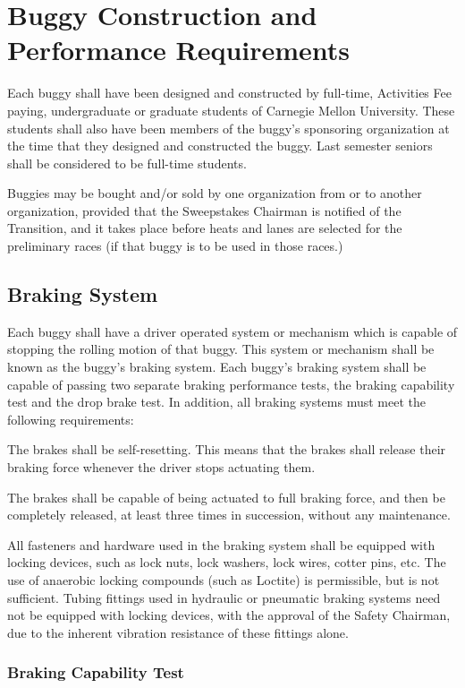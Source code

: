 \chapter{Buggy Construction and Performance Requirements}

Each buggy shall have been designed and constructed by full-time, Activities Fee paying, undergraduate or graduate students of Carnegie Mellon University. These students shall also have been members of the buggy's sponsoring organization at the time that they designed and constructed the buggy. Last semester seniors shall be considered to be full-time students.

Buggies may be bought and/or sold by one organization from or to another organization, provided that the Sweepstakes Chairman is notified of the Transition, and it takes place before heats and lanes are selected for the preliminary races (if that buggy is to be used in those races.)

\section{Braking System}

Each buggy shall have a driver operated system or mechanism which is capable of stopping the rolling motion of that buggy. This system or mechanism shall be known as the buggy's braking system. Each buggy's braking system shall be capable of passing two separate braking performance tests, the braking capability test and the drop brake test. In addition, all braking systems must meet the following requirements:

The brakes shall be self-resetting. This means that the brakes shall release their braking force whenever the driver stops actuating them.

The brakes shall be capable of being actuated to full braking force, and then be completely released, at least three times in succession, without any maintenance.

All fasteners and hardware used in the braking system shall be equipped with locking devices, such as lock nuts, lock washers, lock wires, cotter pins, etc. The use of anaerobic locking compounds (such as Loctite) is permissible, but is not sufficient. Tubing fittings used in hydraulic or pneumatic braking systems need not be equipped with locking devices, with the approval of the Safety Chairman, due to the inherent vibration resistance of these fittings alone.

\subsection{Braking Capability Test}

